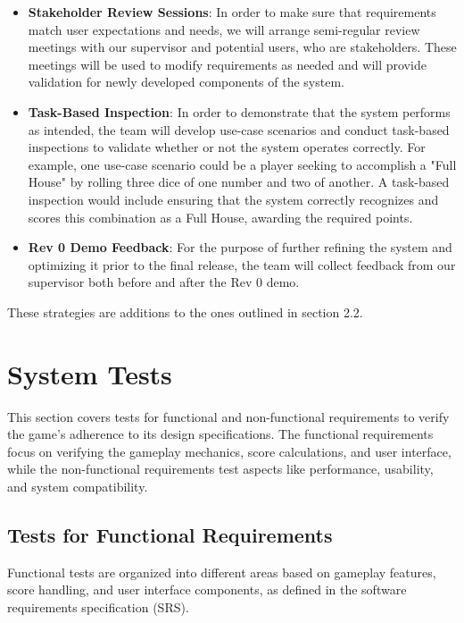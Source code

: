 \documentclass[12pt, titlepage]{article}
\begin{document}
\begin{itemize}
  \item \textbf{Stakeholder Review Sessions}: In order to make sure that requirements match user expectations and needs, we will arrange semi-regular review meetings with our supervisor and potential users, who are stakeholders. These meetings will be used to modify requirements as needed and will provide validation for newly developed components of the system.
  \item \textbf{Task-Based Inspection}: In order to demonstrate that the system performs as intended, the team will develop use-case scenarios and conduct task-based inspections to validate whether or not the system operates correctly. For example, one use-case scenario could be a player seeking to accomplish a "Full House" by rolling three dice of one number and two of another. A task-based inspection would include ensuring that the system correctly recognizes and scores this combination as a Full House, awarding the required points.
  \item \textbf{Rev 0 Demo Feedback}: For the purpose of further refining the system and optimizing it prior to the final release, the team will collect feedback from our supervisor both before and after the Rev 0 demo. 
\end{itemize}

\noindent These strategies are additions to the ones outlined in section 2.2.


\section{System Tests}

This section covers tests for functional and non-functional requirements to verify the game's adherence to its design specifications. The functional requirements focus on verifying the gameplay mechanics, score calculations, and user interface, while the non-functional requirements test aspects like performance, usability, and system compatibility.

\subsection{Tests for Functional Requirements}

Functional tests are organized into different areas based on gameplay features, score handling, and user interface components, as defined in the software requirements specification (SRS).
\end{document}
